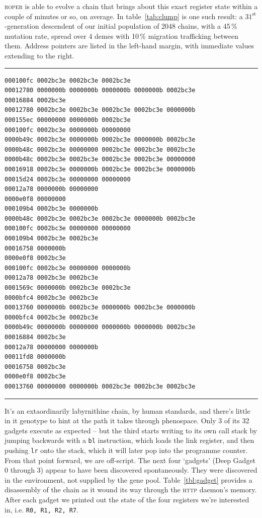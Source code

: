 \textsc{roper} is able to evolve a chain that brings about this
exact register state within a couple of minutes or so, on
average. In table~\ref{tab:clump} is one such result: a
$31^{\textrm{st}}$-generation descendent of our initial
population of 2048 chains, with a 45\,\% mutation rate, spread over
4 demes with 10\,\% migration trafficking between them. Address
pointers are listed in the left-hand margin, with immediate
values extending to the right. 
\begin{table}
\caption{Contents of a successful payload: address pointers on
the left-hand margin, literals extending to the right. Each row
is a `clump'.}
\label{tab:clump}
  \hrule
  {\tiny
\begin{verbatim}
000100fc 0002bc3e 0002bc3e 0002bc3e 
00012780 0000000b 0000000b 0000000b 0000000b 0002bc3e 
00016884 0002bc3e 
00012780 0002bc3e 0002bc3e 0002bc3e 0002bc3e 0000000b 
000155ec 00000000 0000000b 0002bc3e 
000100fc 0002bc3e 0000000b 00000000 
0000b49c 0002bc3e 0000000b 0002bc3e 0000000b 0002bc3e 
0000b48c 0002bc3e 00000000 0002bc3e 0002bc3e 0002bc3e 
0000b48c 0002bc3e 0002bc3e 0002bc3e 0002bc3e 00000000 
00016918 0002bc3e 0000000b 0002bc3e 0002bc3e 0000000b 
00015d24 0002bc3e 00000000 00000000 
00012a78 0000000b 00000000 
0000e0f8 00000000 
000109b4 0002bc3e 0000000b 
0000b48c 0002bc3e 0002bc3e 0002bc3e 0000000b 0002bc3e 
000100fc 0002bc3e 00000000 00000000 
000109b4 0002bc3e 0002bc3e 
00016758 0000000b 
0000e0f8 0002bc3e 
000100fc 0002bc3e 00000000 0000000b 
00012a78 0002bc3e 0002bc3e 
0001569c 0000000b 0002bc3e 0002bc3e 
0000bfc4 0002bc3e 0002bc3e 
00013760 0000000b 0002bc3e 0000000b 0002bc3e 0000000b 
0000bfc4 0002bc3e 0002bc3e 
0000b49c 0000000b 00000000 0000000b 0000000b 0002bc3e 
00016884 0002bc3e 
00012a78 00000000 0000000b 
00011fd8 0000000b 
00016758 0002bc3e 
0000e0f8 0002bc3e 
00013760 00000000 0000000b 0002bc3e 0002bc3e 0002bc3e 
\end{verbatim}
  }
\hrule
\end{table}

It's an extaordinarily labyrnithine chain, by human standards,
and there's little in it genotype to hint at the path it takes
through phenospace. Only 3 of its 32 gadgets execute as expected -- but the
third starts writing to its own call stack by jumping
backwards with a \texttt{bl} instruction, which loads the link
register, and then pushing \texttt{lr} onto the stack, which it will later pop into
the programme counter. From that point forward, we are
off-script.  The next four `gadgets' (Deep Gadget 0 through 3)
appear to have been discovered spontaneously. They were
discovered in the environment, not supplied by the gene pool. 
Table~\ref{tbl:gadget} provides a
disassembly of the chain as it wound its way through the
\textsc{http} daemon's memory. After each gadget we printed
out the state of the four registers we're interested in, i.e. \texttt{R0, R1, R2, R7}.
 
